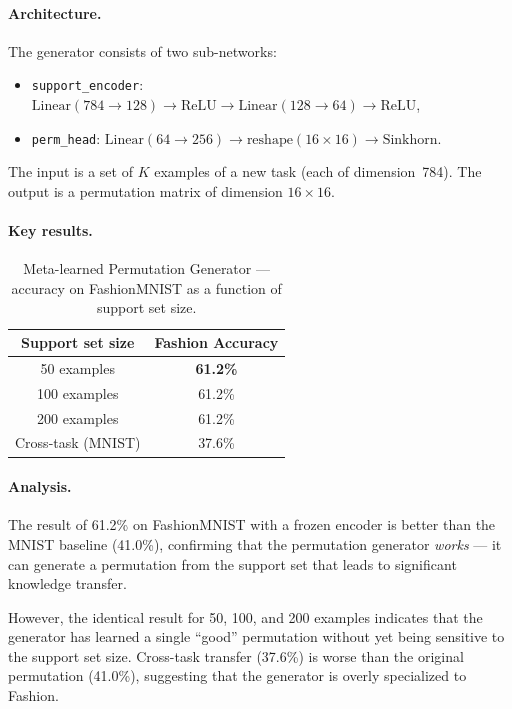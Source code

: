 \documentclass[11pt,a4paper]{report}
\begin{document}
\paragraph{Architecture.}
The generator consists of two sub-networks:
\begin{itemize}
    \item \texttt{support\_encoder}: $\text{Linear}(784 \to 128) \to \text{ReLU} \to \text{Linear}(128 \to 64) \to \text{ReLU}$,
    \item \texttt{perm\_head}: $\text{Linear}(64 \to 256) \to \text{reshape}(16 \times 16) \to \text{Sinkhorn}$.
\end{itemize}
The input is a set of $K$ examples of a new task (each of dimension~784).
The output is a permutation matrix of dimension $16 \times 16$.

\paragraph{Key results.}

\begin{table}[h!]
\centering
\caption{Meta-learned Permutation Generator --- accuracy on FashionMNIST as a function of support set size.}
\begin{tabular}{c c}
\hline
\textbf{Support set size} & \textbf{Fashion Accuracy} \\
\hline
50 examples  & \textbf{61.2\%} \\
100 examples & 61.2\% \\
200 examples & 61.2\% \\
Cross-task (MNIST) & 37.6\% \\
\hline
\end{tabular}
\label{tab:meta_perm_gen_results}
\end{table}

\paragraph{Analysis.}
The result of 61.2\% on FashionMNIST with a frozen encoder is better than the MNIST baseline (41.0\%), confirming
that the permutation generator \emph{works} --- it can generate a permutation from the support set
that leads to significant knowledge transfer.

However, the identical result for 50, 100, and 200 examples indicates that the generator has learned a single
``good'' permutation without yet being sensitive to the support set size.
Cross-task transfer (37.6\%) is worse than the original permutation (41.0\%),
suggesting that the generator is overly specialized to Fashion.
\end{document}

